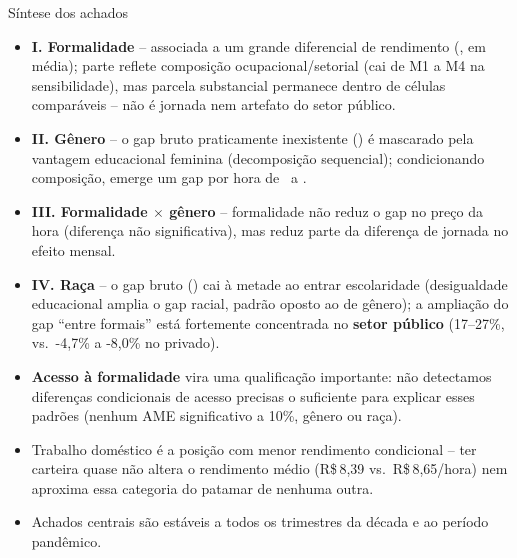 \documentclass[aspectratio=169]{beamer}
\newcommand{\highlight}[1]{\textcolor{accentblue}{\textbf{#1}}}
\begin{document}
\begin{frame}{S\'intese dos achados}
  \scriptsize
  \begin{itemize}
    \item \highlight{I. Formalidade} -- associada a um grande diferencial de rendimento (\PctFormalGeralHoraAmpla, em m\'edia); parte reflete composi\c{c}\~ao ocupacional/setorial (cai de M1 a M4 na sensibilidade), mas parcela substancial permanece dentro de c\'elulas compar\'aveis -- n\~ao \'e jornada nem artefato do setor p\'ublico.
    \item \highlight{II. G\^enero} -- o gap bruto praticamente inexistente (\BrutoGapMulherPct) \'e mascarado pela vantagem educacional feminina (decomposi\c{c}\~ao sequencial); condicionando composi\c{c}\~ao, emerge um gap por hora de \PctGeneroInformal\ a \PctGeneroFormal.
    \item \highlight{III. Formalidade $\times$ g\^enero} -- formalidade n\~ao reduz o gap no pre\c{c}o da hora (diferen\c{c}a n\~ao significativa), mas reduz parte da diferen\c{c}a de jornada no efeito mensal.
    \item \highlight{IV. Ra\c{c}a} -- o gap bruto (\BrutoGapRacaPct) cai \`a metade ao entrar escolaridade (desigualdade educacional amplia o gap racial, padr\~ao oposto ao de g\^enero); a amplia\c{c}\~ao do gap ``entre formais'' est\'a fortemente concentrada no \highlight{setor p\'ublico} (17--27\%, vs.\ -4,7\% a -8,0\% no privado).
    \item \highlight{Acesso \`a formalidade} vira uma qualifica\c{c}\~ao importante: n\~ao detectamos diferen\c{c}as condicionais de acesso precisas o suficiente para explicar esses padr\~oes (nenhum AME significativo a 10\%, g\^enero ou ra\c{c}a).
    \item Trabalho dom\'estico \'e a posi\c{c}\~ao com menor rendimento condicional -- ter carteira quase n\~ao altera o rendimento m\'edio (R\$\,8,39 vs.\ R\$\,8,65/hora) nem aproxima essa categoria do patamar de nenhuma outra.
    \item Achados centrais s\~ao est\'aveis a todos os trimestres da d\'ecada e ao per\'iodo pand\^emico.
  \end{itemize}
\end{frame}
\end{document}
